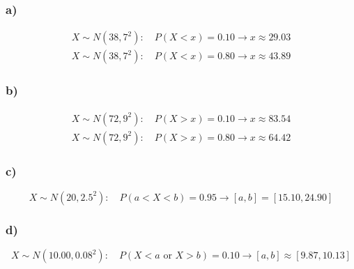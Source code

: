 \subsubsection*{a)}
\[
\begin{array}{l}
	X\sim N(38,7^2):\quad P(X<x)=0.10 \longrightarrow x\approx 29.03
	\\
	X\sim N(38,7^2):\quad P(X<x)=0.80 \longrightarrow x\approx 43.89
\end{array}
\]

\subsubsection*{b)}
\[
\begin{array}{ll}
	X\sim N(72,9^2):\quad P(X>x)=0.10 \longrightarrow x\approx 83.54
	\\
	X\sim N(72,9^2):\quad P(X>x)=0.80 \longrightarrow x\approx 64.42
\end{array}
\]

\subsubsection*{c)}
\[
X\sim N(20,2.5^2):\quad P(a<X<b)=0.95 \longrightarrow [a,b]=[15.10,24.90]
\]

\subsubsection*{d)}
\[
X\sim N(10.00,0.08^2):\quad P(X<a\text{ or }X>b)=0.10 \longrightarrow [a,b]\approx[9.87,10.13]
\]



